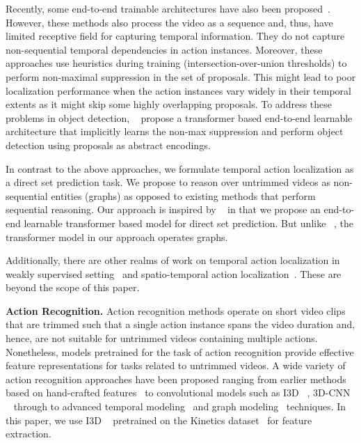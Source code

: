 \documentclass[10pt,twocolumn,letterpaper]{article}
\begin{document}
Recently, some end-to-end trainable architectures have also been proposed~\cite{dai2017temporal,gao2017turn,chao2018rethinking,xu2017r,zeng2019graph,xu2020g}. However, these methods also process the video as a sequence and, thus, have limited receptive field for capturing temporal information. They do not capture non-sequential temporal dependencies in action instances. Moreover, these approaches use heuristics during training (\eg intersection-over-union thresholds) to perform non-maximal suppression in the set of proposals. This might lead to poor localization performance when the action instances vary widely in their temporal extents as it might skip some highly overlapping proposals. To address these problems in object detection, ~\cite{carion2020end} propose a transformer based end-to-end learnable architecture that implicitly learns the non-max suppression and perform object detection using proposals as abstract encodings. 

In contrast to the above approaches, we formulate temporal action localization as a direct set prediction task. We propose to reason over untrimmed videos as non-sequential entities (\ie graphs) as opposed to existing methods that perform sequential reasoning. Our approach is inspired by ~\cite{carion2020end} in that we propose an end-to-end learnable transformer based model for direct set prediction. But unlike ~\cite{carion2020end}, the transformer model in our approach operates graphs. 

Additionally, there are other realms of work on temporal action localization in weakly supervised setting~\cite{Shou_2018_ECCV,wang2017untrimmednets,jain2020actionbytes} and spatio-temporal action localization~\cite{singh2017online,kalogeiton2017action,gkioxari2015finding,girdhar2019video}. These are beyond the scope of this paper.

\vspace{0.05in}
\noindent
\textbf{Action Recognition.} Action recognition methods operate on short video clips that are trimmed such that a single action instance spans the video duration and, hence, are not suitable for untrimmed videos containing multiple actions. Nonetheless, models pretrained for the task of action recognition provide effective feature representations for tasks related to untrimmed videos. A wide variety of action recognition approaches have been proposed ranging from earlier methods based on hand-crafted features~\cite{laptev2005space,dalal2006human,wang2013action} to convolutional models such as I3D ~\cite{simonyan2014two}, 3D-CNN ~\cite{tran2015learning} through to advanced temporal modeling~\cite{wang2015action,wang2016temporal,zhang2016real} and graph modeling~\cite{wang2018videos,jain2016structural} techniques. In this paper, we use I3D ~\cite{simonyan2014two} pretrained on the Kinetics dataset~\cite{carreira2017quo} for feature extraction.
\end{document}
